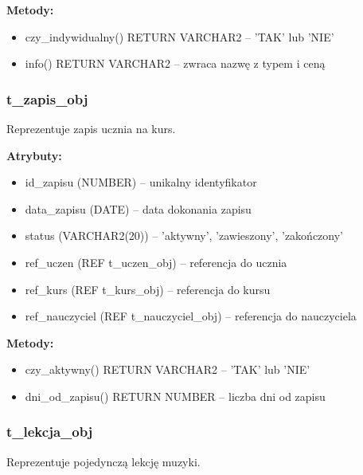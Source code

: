 \documentclass[12pt,a4paper]{article}
\begin{document}
\textbf{Metody:}
\begin{itemize}[nosep]
    \item czy\_indywidualny() RETURN VARCHAR2 -- 'TAK' lub 'NIE'
    \item info() RETURN VARCHAR2 -- zwraca nazwę z typem i ceną
\end{itemize}

\subsubsection{t\_zapis\_obj}
Reprezentuje zapis ucznia na kurs.

\textbf{Atrybuty:}
\begin{itemize}[nosep]
    \item id\_zapisu (NUMBER) -- unikalny identyfikator
    \item data\_zapisu (DATE) -- data dokonania zapisu
    \item status (VARCHAR2(20)) -- 'aktywny', 'zawieszony', 'zakończony'
    \item ref\_uczen (REF t\_uczen\_obj) -- referencja do ucznia
    \item ref\_kurs (REF t\_kurs\_obj) -- referencja do kursu
    \item ref\_nauczyciel (REF t\_nauczyciel\_obj) -- referencja do nauczyciela
\end{itemize}

\textbf{Metody:}
\begin{itemize}[nosep]
    \item czy\_aktywny() RETURN VARCHAR2 -- 'TAK' lub 'NIE'
    \item dni\_od\_zapisu() RETURN NUMBER -- liczba dni od zapisu
\end{itemize}

\subsubsection{t\_lekcja\_obj}
Reprezentuje pojedynczą lekcję muzyki.
\end{document}

